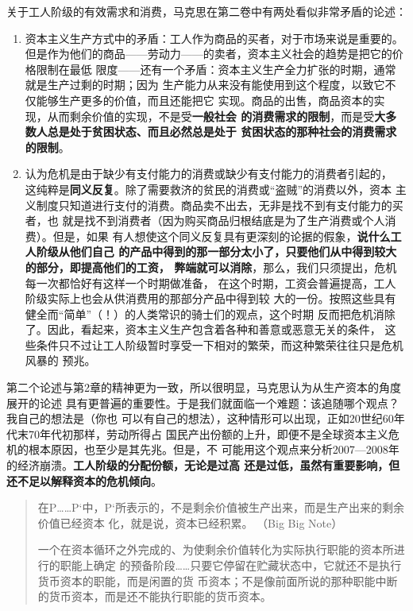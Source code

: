 关于工人阶级的有效需求和消费，马克思在第二卷中有两处看似非常矛盾的论述：
\begin{enumerate}
\item {\kaishu 资本主义生产方式中的矛盾：工人作为商品的买者，对于市场来说是重要的。
    但是作为他们的商品——劳动力——的卖者，资本主义社会的趋势是把它的价格限制在最低
    限度——还有一个矛盾：资本主义生产全力扩张的时期，通常就是生产过剩的时期；因为
    生产能力从来没有能使用到这个程度，以致它不仅能够生产更多的价值，而且还能把它
    实现。商品的出售，商品资本的实现，从而剩余价值的实现，不是受\textbf{一般社会
      的消费需求的限制}，而是受\textbf{大多数人总是处于贫困状态、而且必然总是处于
      贫困状态的那种社会的消费需求的限制}。 }

 
\item {\kaishu 认为危机是由于缺少有支付能力的消费或缺少有支付能力的消费者引起的，
    这纯粹是\textbf{同义反复}。除了需要救济的贫民的消费或“盗贼”的消费以外，资本
    主义制度只知道进行支付的消费。商品卖不出去，无非是找不到有支付能力的买者，也
    就是找不到消费者（因为购买商品归根结底是为了生产消费或个人消费）。但是，如果
    有人想使这个同义反复具有更深刻的论据的假象，\textbf{说什么工人阶级从他们自己
      的产品中得到的那一部分太小了，只要他们从中得到较大的部分，即提高他们的工资，
      弊端就可以消除}，那么，我们只须提出，危机每一次都恰好有这样一个时期做准备，
    在这个时期，工资会普遍提高，工人阶级实际上也会从供消费用的那部分产品中得到较
    大的一份。按照这些具有健全而“简单”（！）的人类常识的骑士们的观点，这个时期
    反而把危机消除了。因此，看起来，资本主义生产包含着各种和善意或恶意无关的条件，
    这些条件只不过让工人阶级暂时享受一下相对的繁荣，而这种繁荣往往只是危机风暴的
    预兆。 }
\end{enumerate}

第二个论述与第2章的精神更为一致，所以很明显，马克思认为从生产资本的角度展开的论述
具有更普遍的重要性。于是我们就面临一个难题：该追随哪个观点？我自己的想法是（你也
可以有自己的想法），这种情形可以出现，正如20世纪60年代末70年代初那样，劳动所得占
国民产出份额的上升，即便不是全球资本主义危机的根本原因，也至少是其先兆。但是，不
可能用这个观点来分析2007—2008年的经济崩溃。\textbf{工人阶级的分配份额，无论是过高
  还是过低，虽然有重要影响，但还不足以解释资本的危机倾向}。

\begin{quotation}
在P……P`中，P`所表示的，不是剩余价值被生产出来，而是生产出来的剩余价值已经资本
化，就是说，资本已经积累。 （Big Big Note）

一个在资本循环之外完成的、为使剩余价值转化为实际执行职能的资本所进行的职能上确定
的预备阶段……只要它停留在贮藏状态中，它就还不是执行货币资本的职能，而是闲置的货
币资本；不是像前面所说的那种职能中断的货币资本，而是还不能执行职能的货币资本。 

\end{quotation}


